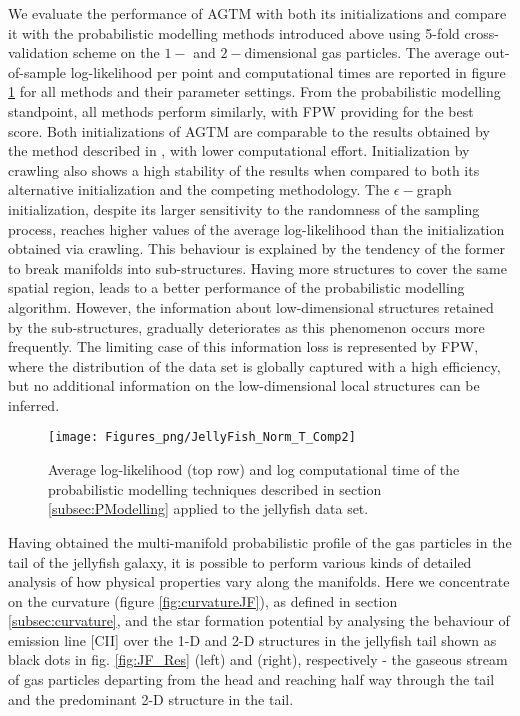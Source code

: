 We evaluate the performance of AGTM with both its initializations and compare it with the probabilistic modelling methods introduced above
using 5-fold cross-validation scheme on the $1-$ and $2-$dimensional gas particles.
The average out-of-sample log-likelihood per point and computational times are reported in figure \ref{fig:JF_Norm_logL} for all methods and their parameter settings. From the probabilistic modelling standpoint, all methods perform similarly, with FPW providing for the best score. Both initializations of AGTM are comparable to the results obtained by the method described in \cite{990138}, with lower computational effort.
Initialization by crawling also shows a high stability of the results when compared to both its alternative initialization and the competing methodology. The $\epsilon-$graph initialization, despite its larger sensitivity to the randomness of the sampling process, reaches higher values of the average log-likelihood than the initialization obtained via crawling. This behaviour is explained by the tendency of the former to break manifolds into sub-structures. Having more structures to cover the same spatial region, leads to a better performance of the probabilistic modelling algorithm. However, the information about low-dimensional structures retained by the sub-structures, gradually deteriorates as this phenomenon occurs more frequently. The limiting case of this information loss is represented by FPW, where the distribution of the data set is globally captured with a high efficiency, but no additional information on the low-dimensional local structures can be inferred.
\begin{figure}[h!]
\centering
\texttt{[image: Figures\_png/JellyFish\_Norm\_T\_Comp2]}\caption{Average log-likelihood (top row) and log computational time of the probabilistic modelling techniques described in section \ref{subsec:PModelling} applied to the jellyfish data set.}\label{fig:JF_Norm_logL}
\end{figure}
Having obtained the multi-manifold probabilistic profile of the gas particles in the tail of the jellyfish galaxy, it is possible to perform various kinds of detailed analysis of how physical properties vary along the manifolds.
Here we concentrate on the curvature (figure \ref{fig:curvatureJF}), as defined in section \ref{subsec:curvature}, and the star formation potential by analysing the behaviour of emission line [CII] over the 1-D and 2-D structures in the jellyfish tail shown as black dots in fig. \ref{fig:JF_Res} (left) and (right), respectively - the gaseous stream of gas particles departing from the head and reaching half way through the tail and the predominant 2-D structure in the tail.
